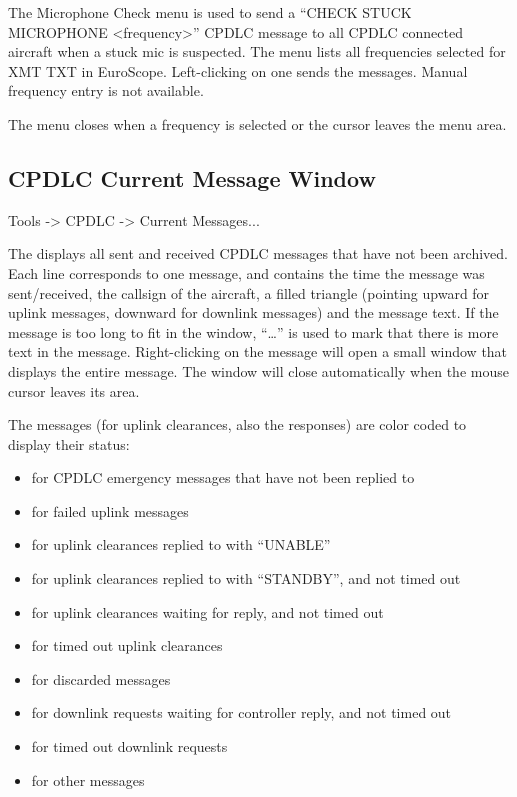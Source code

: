 \documentclass[a4paper,oneside,11pt]{memoir}
\begin{document}
\bigskip


The Microphone Check menu is used to send a “CHECK STUCK MICROPHONE <frequency>” CPDLC message to all CPDLC connected aircraft when a stuck mic is suspected. The menu lists all frequencies selected for XMT TXT in EuroScope. Left-clicking on one sends the messages. Manual frequency entry is not available.

\bigskip

The menu closes when a frequency is selected or the cursor leaves the menu area.

\subsection{CPDLC Current Message Window}
\label{win:dlcmw}

 Tools -> CPDLC -> Current Messages...

\bigskip


The  displays all sent and received CPDLC messages that have not been archived. Each line corresponds to one message, and contains the time the message was sent/received, the callsign of the aircraft, a filled triangle (pointing upward for uplink messages, downward for downlink messages) and the message text. If the message is too long to fit in the window, “…” is used to mark that there is more text in the message. Right-clicking on the message will open a small window that displays the entire message. The window will close automatically when the mouse cursor leaves its area.

\bigskip

The messages (for uplink clearances, also the responses) are color coded to display their status:

\begin{itemize}
    \item {} for CPDLC emergency messages that have not been replied to
    \item {} for failed uplink messages
    \item {} for uplink clearances replied to with “UNABLE”
    \item {} for uplink clearances replied to with “STANDBY”, and not timed out
    \item {} for uplink clearances waiting for reply, and not timed out
    \item {} for timed out uplink clearances
    \item {} for discarded messages
    \item {} for downlink requests waiting for controller reply, and not timed out
    \item {} for timed out downlink requests
    \item {} for other messages
\end{itemize}
\end{document}
